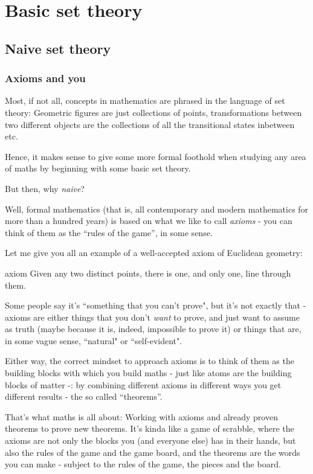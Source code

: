 \chapter{Basic set theory}
\section{Naive set theory}
\subsection{Axioms and you}

Most, if not all, concepts in mathematics are phrased in the language of set theory: Geometric figures are just collections of points, transformations between two different objects are the collections of all the transitional states inbetween etc.

Hence, it makes sense to give some more formal foothold when studying any area of maths by beginning with some basic set theory.

But then, why \textit{naive}?

Well, formal mathematics (that is, all contemporary and modern mathematics for more than a hundred years) is based on what we like to call \textit{axioms} - you can think of them as the ``rules of the game'', in some sense.

Let me give you all an example of a well-accepted axiom of Euclidean geometry:

\begin{blockenv}{axiom}
	Given any two distinct points, there is one, and only one, line through them.
\end{blockenv}

Some people say it's ``something that you can't prove", but it's not exactly that - axioms are either things that you don't \textit{want} to prove, and just want to assume as truth (maybe because it is, indeed, impossible to prove it) or things that are, in some vague sense, ``natural" or ``self-evident".

Either way, the correct mindset to approach axioms is to think of them as the building blocks with which you build maths - just like atoms are the building blocks of matter -: by combining different axioms in different ways you get different results - the so called ``theorems''.

That's what maths is all about: Working with axioms and already proven theorems to prove new theorems. It's kinda like a game of scrabble, where the axioms are not only the blocks you (and everyone else) has in their hands, but also the rules of the game and the game board, and the theorems are the words you can make - subject to the rules of the game, the pieces and the board.

